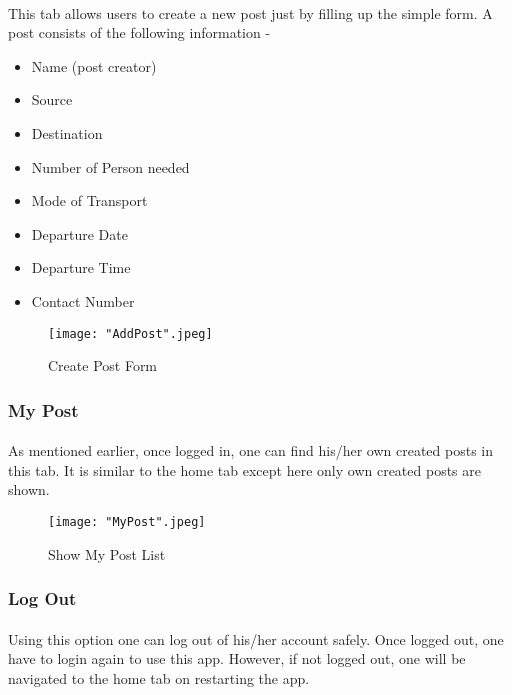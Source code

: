 \documentclass[12pt, a4paper]{article}
\begin{document}
\paragraph{}
This tab allows users to create a new post just by filling up the simple form. A post consists of the following information -
\begin{multicols}{2}
\begin{itemize}
\item Name (post creator)
\item Source
\item Destination
\item Number of Person needed
\item Mode of Transport
\item Departure Date
\item Departure Time
\item Contact Number
 \end{itemize}
 \end{multicols}
 \begin{figure}[htp]
    \centering
    \texttt{[image: "AddPost".jpeg]}
    \caption{Create Post Form}
\end{figure}
\newpage
\subsubsection{My Post}
\paragraph{}
As mentioned earlier, once logged in, one can find his/her own created posts in this tab. It is similar to the home tab except here only own created posts are shown.
\\
 \begin{figure}[htp]
    \centering
    \texttt{[image: "MyPost".jpeg]}
    \caption{Show My Post List}
\end{figure}
\subsubsection{Log Out}
\paragraph{}
Using this option one can log out of his/her account safely. Once logged out, one have to login again to use this app. However, if not logged out, one will be navigated to the home tab on restarting the app.
\end{document}
